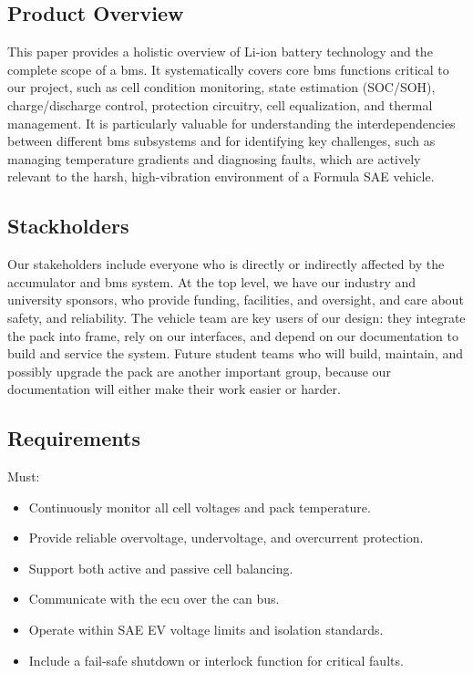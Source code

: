 \subsection{Product Overview}
This paper provides a holistic overview of Li-ion battery technology and the complete scope of a \gls{bms}. It systematically covers core \gls{bms} functions critical to our project, such as cell condition monitoring, state estimation (SOC/SOH), charge/discharge control, protection circuitry, cell equalization, and thermal management. It is particularly valuable for understanding the interdependencies between different \gls{bms} subsystems and for identifying key challenges, such as managing temperature gradients and diagnosing faults, which are actively relevant to the harsh, high-vibration environment of a Formula SAE vehicle.

\subsection{Stackholders}
Our stakeholders include everyone who is directly or indirectly affected by the accumulator and \gls{bms} system. At the top level, we have our industry and university sponsors, who provide funding, facilities, and oversight, and care about safety, and reliability. The vehicle team are key users of our design: they integrate the pack into frame, rely on our interfaces, and depend on our documentation to build and service the system. Future student teams who will build, maintain, and possibly upgrade the pack are another important group, because our documentation will either make their work easier or harder.

\subsection{Requirements}

Must:
\begin{itemize}
	\item Continuously monitor all cell voltages and pack temperature.
	\item Provide reliable overvoltage, undervoltage, and overcurrent protection.
	\item Support both active and passive cell balancing.
	\item Communicate with the \gls{ecu} over the \gls{can} bus.
	\item Operate within SAE EV voltage limits and isolation standards.
	\item Include a fail-safe shutdown or interlock function for critical faults.
\end{itemize}

